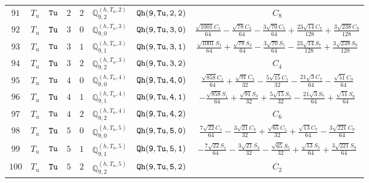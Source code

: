 \documentclass[fleqn,8pt]{jsarticle}
\begin{document}
\begin{table}[ht!]
\begin{center}
\begin{tabular}{cccccccc}
$ 91 $ & $ T_{u} $ & $ {\tt Tu} $ & $ 2 $ & $ 2 $ & $ \mathbb{Q}_{9,2}^{(h,T_{u},2)} $ & $ {\tt Qh(9,Tu,2,2)} $ & $ C_{8} $ \\
$ 92 $ & $ T_{u} $ & $ {\tt Tu} $ & $ 3 $ & $ 0 $ & $ \mathbb{Q}_{9,0}^{(h,T_{u},3)} $ & $ {\tt Qh(9,Tu,3,0)} $ & $ \frac{\sqrt{1001} C_{1}}{64} - \frac{\sqrt{78} C_{3}}{64} - \frac{3 \sqrt{70} C_{5}}{64} + \frac{23 \sqrt{14} C_{7}}{128} + \frac{3 \sqrt{238} C_{9}}{128} $ \\
$ 93 $ & $ T_{u} $ & $ {\tt Tu} $ & $ 3 $ & $ 1 $ & $ \mathbb{Q}_{9,1}^{(h,T_{u},3)} $ & $ {\tt Qh(9,Tu,3,1)} $ & $ \frac{\sqrt{1001} S_{1}}{64} + \frac{\sqrt{78} S_{3}}{64} - \frac{3 \sqrt{70} S_{5}}{64} - \frac{23 \sqrt{14} S_{7}}{128} + \frac{3 \sqrt{238} S_{9}}{128} $ \\
$ 94 $ & $ T_{u} $ & $ {\tt Tu} $ & $ 3 $ & $ 2 $ & $ \mathbb{Q}_{9,2}^{(h,T_{u},3)} $ & $ {\tt Qh(9,Tu,3,2)} $ & $ C_{4} $ \\
$ 95 $ & $ T_{u} $ & $ {\tt Tu} $ & $ 4 $ & $ 0 $ & $ \mathbb{Q}_{9,0}^{(h,T_{u},4)} $ & $ {\tt Qh(9,Tu,4,0)} $ & $ \frac{\sqrt{858} C_{1}}{64} + \frac{\sqrt{91} C_{3}}{32} - \frac{5 \sqrt{15} C_{5}}{32} - \frac{21 \sqrt{3} C_{7}}{64} - \frac{\sqrt{51} C_{9}}{64} $ \\
$ 96 $ & $ T_{u} $ & $ {\tt Tu} $ & $ 4 $ & $ 1 $ & $ \mathbb{Q}_{9,1}^{(h,T_{u},4)} $ & $ {\tt Qh(9,Tu,4,1)} $ & $ - \frac{\sqrt{858} S_{1}}{64} + \frac{\sqrt{91} S_{3}}{32} + \frac{5 \sqrt{15} S_{5}}{32} - \frac{21 \sqrt{3} S_{7}}{64} + \frac{\sqrt{51} S_{9}}{64} $ \\
$ 97 $ & $ T_{u} $ & $ {\tt Tu} $ & $ 4 $ & $ 2 $ & $ \mathbb{Q}_{9,2}^{(h,T_{u},4)} $ & $ {\tt Qh(9,Tu,4,2)} $ & $ C_{6} $ \\
$ 98 $ & $ T_{u} $ & $ {\tt Tu} $ & $ 5 $ & $ 0 $ & $ \mathbb{Q}_{9,0}^{(h,T_{u},5)} $ & $ {\tt Qh(9,Tu,5,0)} $ & $ \frac{7 \sqrt{22} C_{1}}{64} - \frac{3 \sqrt{21} C_{3}}{32} + \frac{\sqrt{65} C_{5}}{32} + \frac{\sqrt{13} C_{7}}{64} - \frac{3 \sqrt{221} C_{9}}{64} $ \\
$ 99 $ & $ T_{u} $ & $ {\tt Tu} $ & $ 5 $ & $ 1 $ & $ \mathbb{Q}_{9,1}^{(h,T_{u},5)} $ & $ {\tt Qh(9,Tu,5,1)} $ & $ - \frac{7 \sqrt{22} S_{1}}{64} - \frac{3 \sqrt{21} S_{3}}{32} - \frac{\sqrt{65} S_{5}}{32} + \frac{\sqrt{13} S_{7}}{64} + \frac{3 \sqrt{221} S_{9}}{64} $ \\
$ 100 $ & $ T_{u} $ & $ {\tt Tu} $ & $ 5 $ & $ 2 $ & $ \mathbb{Q}_{9,2}^{(h,T_{u},5)} $ & $ {\tt Qh(9,Tu,5,2)} $ & $ C_{2} $ \\
 \hline \hline
\end{tabular}
\end{center}
\end{table}
\end{document}
